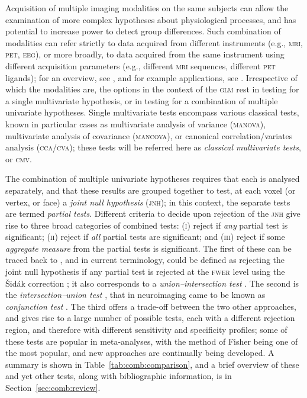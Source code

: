 Acquisition of multiple imaging modalities on the same subjects can allow the examination of more complex hypotheses about physiological processes, and has potential to increase power to detect group differences. Such combination of modalities can refer strictly to data acquired from different instruments (e.g., \textsc{mri}, \textsc{pet}, \textsc{eeg}), or more broadly, to data acquired from the same instrument using different acquisition parameters (e.g., different \textsc{mri} sequences, different \textsc{pet} ligands); for an overview, see \citet{Uludag2014,Zhu2014,Calhoun2016}, and for example applications, see \citet{Hayasaka2006, Thomas2016}. Irrespective of which the modalities are, the options in the context of the \textsc{glm} rest in testing for a single multivariate hypothesis, or in testing for a combination of multiple univariate hypotheses. Single multivariate tests encompass various classical tests, known in particular cases as multivariate analysis of variance (\textsc{manova}), multivariate analysis of covariance (\textsc{mancova}), or canonical correlation/variates analysis (\textsc{cca}/\textsc{cva}); these tests will be referred here as \emph{classical multivariate tests}, or \textsc{cmv}.

The combination of multiple univariate hypotheses requires that each is analysed separately, and that these results are grouped together to test, at each voxel (or vertex, or face) a \emph{joint null hypothesis} (\textsc{jnh}); in this context, the separate tests are termed \emph{partial tests}. Different criteria to decide upon rejection of the \textsc{jnh} give rise to three broad categories of combined tests: (\textsc{i}) reject if \emph{any} partial test is significant; (\textsc{ii}) reject if \emph{all} partial tests are significant; and (\textsc{iii}) reject if some \emph{aggregate measure} from the partial tests is significant. The first of these can be traced back to \citet{Tippett1931}, and in current terminology, could be defined as rejecting the joint null hypothesis if any partial test is rejected at the \textsc{fwer} level using the \v{S}id\'{a}k correction \citep{Sidak1967}; it also corresponds to a \emph{union--intersection test} \citep[\textsc{uit},][]{Roy1953}. The second is the \emph{intersection--union test} \citep[\textsc{iut},][]{Berger1982}, that in neuroimaging came to be known as \emph{conjunction test} \citep{Nichols2005}. The third offers a trade-off between the two other approaches, and gives rise to a large number of possible tests, each with a different rejection region, and therefore with different sensitivity and specificity profiles; some of these tests are popular in meta-analyses, with the method of Fisher \citep{Fisher1932} being one of the most popular, and new approaches are continually being developed. A summary is shown in Table~\ref{tab:comb:comparison}, and a brief overview of these and yet other tests, along with bibliographic information, is in Section~\ref{sec:comb:review}.

